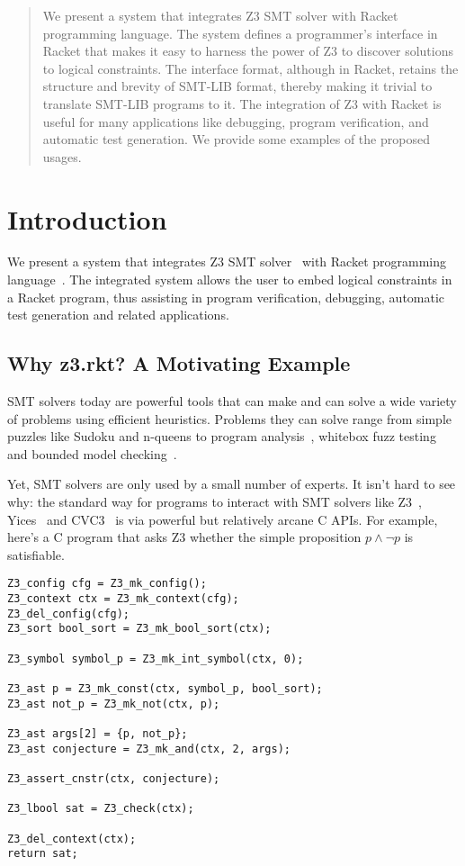 \begin{abstract}
 We present a system that integrates Z3 SMT solver with
 Racket programming language. The system defines a programmer's
 interface in Racket that makes it easy to harness the power
 of Z3 to discover solutions to logical constraints. The
 interface format, although in Racket, retains the structure
 and brevity of SMT-LIB format, thereby making it trivial to
 translate SMT-LIB programs to it. The integration of Z3
 with Racket is useful for many applications like debugging,
 program verification, and automatic test generation. We
 provide some examples of the proposed usages.
\end{abstract}
\section{Introduction}
We present a system that integrates Z3 SMT solver~\cite{z3} with
Racket programming language~\cite{racket}. The integrated
system allows the user to embed logical constraints in a
Racket program, thus assisting in program verification,
debugging, automatic test generation and related
applications.

\subsection{Why z3.rkt? A Motivating Example}

SMT solvers today are powerful tools that can make and can solve a wide variety
of problems using efficient heuristics. Problems they can solve range from
simple puzzles like Sudoku and n-queens to program analysis~\cite{Gulwani:08},
whitebox fuzz testing~\cite{Godefroid:08} and bounded model
checking~\cite{Armando:09}.

Yet, SMT solvers are only used by a small number of experts. It isn't hard to
see why: the standard way for programs to interact with SMT solvers like
Z3~\cite{z3}, Yices~\cite{yices} and CVC3~\cite{cvc3} is via powerful but
relatively arcane C APIs. For example, here's a C program that asks Z3 whether
the simple proposition $p \wedge \neg p$ is satisfiable.

\begin{verbatim}
Z3_config cfg = Z3_mk_config();
Z3_context ctx = Z3_mk_context(cfg);
Z3_del_config(cfg);
Z3_sort bool_sort = Z3_mk_bool_sort(ctx);

Z3_symbol symbol_p = Z3_mk_int_symbol(ctx, 0);

Z3_ast p = Z3_mk_const(ctx, symbol_p, bool_sort);
Z3_ast not_p = Z3_mk_not(ctx, p);

Z3_ast args[2] = {p, not_p};
Z3_ast conjecture = Z3_mk_and(ctx, 2, args);

Z3_assert_cnstr(ctx, conjecture);

Z3_lbool sat = Z3_check(ctx);

Z3_del_context(ctx);
return sat;
\end{verbatim}


